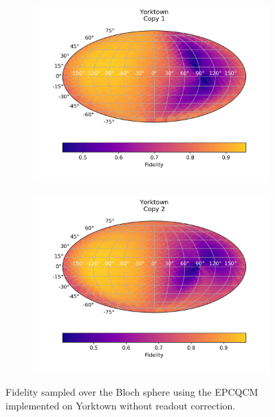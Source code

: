   \begin{figure}[H]
    \centering
    \begin{subfigure}{.5\textwidth}
      \centering
      \includegraphics[width=\textwidth]{Figures/Economical/IBM/FullSphere/results_ibmqx2_copy1.png}
      
      \label{fig:epc_uncorrected_yorktown_sphere_1}
    \end{subfigure}%
    \begin{subfigure}{.5\textwidth}
      \centering
      \includegraphics[width=\textwidth]{Figures/Economical/IBM/FullSphere/results_ibmqx2_copy2.png}
      
      \label{fig:epc_uncorrected_yorktown_sphere_2}
    \end{subfigure}
    \caption{Fidelity sampled over the Bloch sphere using the EPCQCM implemented on Yorktown without readout correction.}
    \label{fig:epc_uncorrected_yorktown_sphere}
  \end{figure}

